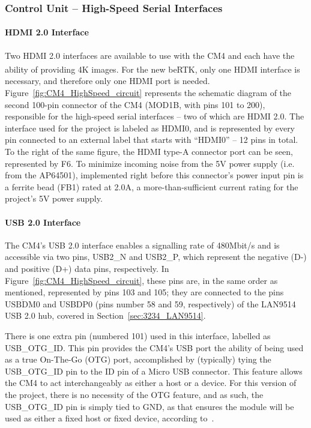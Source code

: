 
\subsubsection{Control Unit -- High-Speed Serial Interfaces}\label{sec:3221_CM4_HSpeed}

\paragraph{HDMI 2.0 Interface}	Two HDMI 2.0 interfaces are available to use with the CM4 and each have the ability of providing 4K images. For the new beRTK\textsuperscript{\textregistered}, only one HDMI interface is necessary, and therefore only one HDMI port is needed. Figure~\ref{fig:CM4_HighSpeed_circuit} represents the schematic diagram of the second 100-pin connector of the CM4 (MOD1B, with pins 101 to 200), responsible for the high-speed serial interfaces -- two of which are HDMI 2.0. The interface used for the project is labeled as HDMI0, and is represented by every pin connected to an external label that starts with ``HDMI0'' -- 12 pins in total. To the right of the same figure, the HDMI type-A connector port can be seen, represented by F6. To minimize incoming noise from the 5V power supply (i.e. from the AP64501), implemented right before this connector's power input pin is a ferrite bead (FB1) rated at 2.0A, a more-than-sufficient current rating for the project's 5V power supply.

\paragraph{USB 2.0 Interface}	The CM4's USB 2.0 interface enables a signalling rate of 480Mbit/s and is accessible via two pins, USB2\_N and USB2\_P, which represent the negative (D-) and positive (D+) data pins, respectively. In Figure~\ref{fig:CM4_HighSpeed_circuit}, these pins are, in the same order as mentioned, represented by pins 103 and 105; they are connected to the pins $\overline{\mbox{USBDM0}}$ and USBDP0 (pins number 58 and 59, respectively) of the LAN9514 USB 2.0 hub, covered in Section~\ref{sec:3234_LAN9514}.

There is one extra pin (numbered 101) used in this interface, labelled as USB\_OTG\_ID. This pin  provides the CM4's USB port the ability of being used as a true On-The-Go (OTG) port, accomplished by (typically) tying the USB\_OTG\_ID pin to the ID pin of a Micro USB connector. This feature allows the CM4 to act interchangeably as either a host or a device. For this version of the project, there is no necessity of the OTG feature, and as such, the USB\_OTG\_ID pin is simply tied to GND, as that ensures the module will be used as either a fixed host or fixed device, according to~\cite{CM4}.

